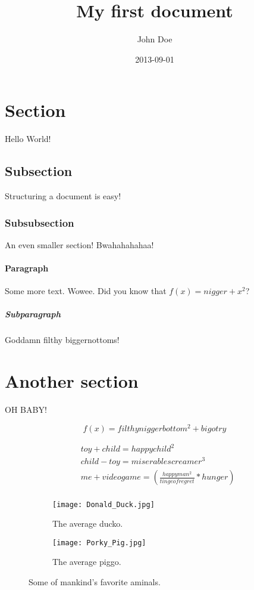 \documentclass{article}
\title{My first document}
\date{2013-09-01}
\author{John Doe}
\begin{document}
	
	\maketitle
	\newpage
	
	\section{Section}
	
	Hello World!
	
	\subsection{Subsection}
	
	Structuring a document is easy!
	
	\subsubsection{Subsubsection}
	
	An even smaller section! Bwahahahahaa! 
	
	\paragraph{Paragraph}
	
	Some more text. Wowee. Did you know that $f(x) = nigger + x^2$?
	
	\subparagraph{Subparagraph}
	
	Goddamn filthy biggernottoms!
	
	\section{Another section}
	
	OH BABY!
	
	\begin{equation*}
	f(x) = filthyniggerbottom^2 + bigotry
	\end{equation*}
	
	\begin{align*}
	&toy + child = happychild^2\\
	&child - toy = miserablescreamer^3\\
	&me  + videogame = \left(\frac{happyman^2}{tingeofregret} * hunger\right)\\
	\end{align*}
	
	\begin{figure}[h!]
		\centering
		\begin{subfigure}[b]{0.4\linewidth}
			\texttt{[image: Donald\_Duck.jpg]}
			\caption{The average ducko.}
		\end{subfigure}
		\begin{subfigure}[b]{0.4\linewidth}
			\texttt{[image: Porky\_Pig.jpg]}
			\caption{The average piggo.}
		\end{subfigure}
		\caption{Some of mankind's favorite aminals.}
		\label{fig:animals}
	\end{figure}
	
\end{document}
